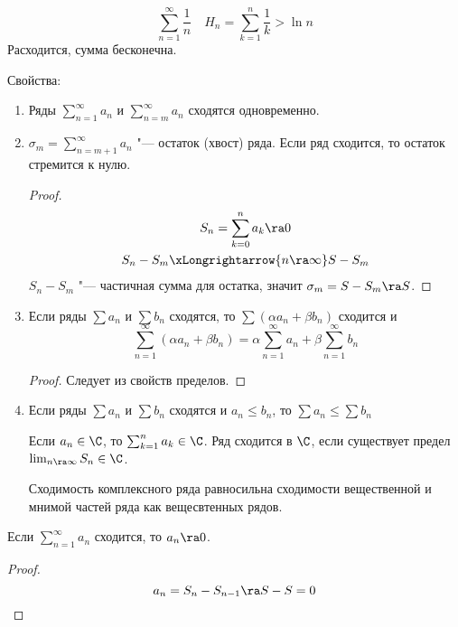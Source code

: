 \begin{exmp}
	\[
		\sum_{n=1}^\infty \frac1n \quad H_n = \sum_{k=1}^n \frac1k > \ln n
	\]
	Расходится, сумма бесконечна.
\end{exmp}

Свойства:
\begin{enumerate}
\item
	Ряды $\sum_{n=1}^\infty a_n$ и $\sum_{n=m}^\infty a_n$ сходятся одновременно.

\item
	$\sigma_m = \sum_{n=m+1}^\infty a_n$ "--- остаток (хвост) ряда.
	Если ряд сходится, то остаток стремится к нулю.
	\begin{proof}
		\begin{gather*}
			S_n = \sum_{k=0}^n a_k \ra 0 \\
			S_n - S_m \xLongrightarrow{n \ra \infty} S - S_m
		\end{gather*}
		$S_n - S_m$ "--- частичная сумма для остатка, значит $\sigma_m = S - S_m \ra S$.
	\end{proof}

\item
	Если ряды $\sum a_n$ и $\sum b_n$ сходятся, то $\sum (\alpha a_n + \beta b_n)$ сходится и
	\[ \sum_{n=1}^\infty (\alpha a_n + \beta b_n) = \alpha \sum_{n=1}^\infty a_n + \beta \sum_{n=1}^\infty b_n \]
	\begin{proof}
		Следует из свойств пределов.
	\end{proof}

\item
	Если ряды $\sum a_n$ и $\sum b_n$ сходятся и $a_n \le b_n$, то $\sum a_n \le \sum b_n$

\begin{Def}
	Если $a_n \in \C$, то $\sum_{k=1}^n a_k \in \C$. Ряд сходится в $\C$, если существует предел $\lim_{n\ra\infty} S_n \in \C$.
\end{Def}
\begin{Rem}
	Сходимость комплексного ряда равносильна сходимости вещественной и мнимой частей ряда как вещесвтенных рядов.
\end{Rem}
\end{enumerate}

\begin{theorem}
	Если $\sum_{n=1}^\infty a_n$ сходится, то $a_n \ra 0$.
\end{theorem}
\begin{proof}
	\[ a_n = S_n - S_{n-1} \ra S - S = 0 \]
\end{proof}

